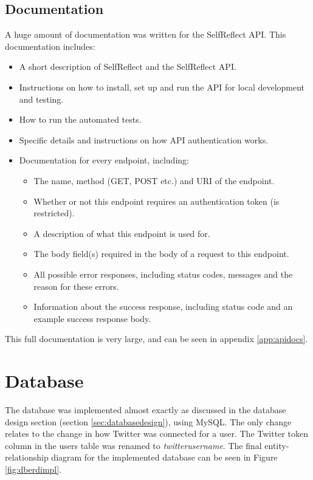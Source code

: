 \documentclass[11pt,openright,a4paper]{report}
\begin{document}
\subsection{Documentation} \label{sec:apidocs}
A huge amount of documentation was written for the SelfReflect API. This documentation includes:
\begin{itemize}
\item A short description of SelfReflect and the SelfReflect API.
\item Instructions on how to install, set up and run the API for local development and testing.
\item How to run the automated tests.
\item Specific details and instructions on how API authentication works.
\item Documentation for every endpoint, including:
  \begin{itemize}
  \item The name, method (GET, POST etc.) and URI of the endpoint.
  \item Whether or not this endpoint requires an authentication token (is restricted).
  \item A description of what this endpoint is used for.
  \item The body field(s) required in the body of a request to this endpoint.
  \item All possible error responses, including status codes, messages and the reason for these errors.
  \item Information about the success response, including status code and an example success response body.
  \end{itemize}
\end{itemize}

This full documentation is very large, and can be seen in appendix \ref{app:apidocs}.

\section{Database}
The database was implemented almost exactly as discussed in the database design section (section \ref{sec:databasedesign}), using MySQL. The only change relates to the change in how Twitter was connected for a user. The Twitter token column in the users table was renamed to \emph{twitter\textunderscore username}. The final entity-relationship diagram for the implemented database can be seen in Figure \ref{fig:dberdimpl}.
\end{document}
